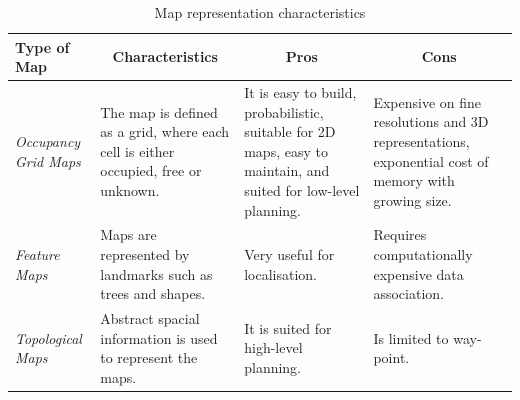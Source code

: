 \begin{table}[H]

\centering
\caption{Map representation characteristics}
\label{table:maprep}
\footnotesize
\begin{tabular}{p{4.5em} p{5.5cm} p{4cm} p{4cm}} 
\toprule[1.5pt] 
\multicolumn{1}{l}{\textbf{Type of Map}} & 
\multicolumn{1}{c}{\textbf{Characteristics}} &
\multicolumn{1}{c}{\textbf{Pros}} &
\multicolumn{1}{c}{\textbf{Cons}}  \\ 
\midrule[0.5pt]
		{\em Occupancy Grid Maps} &
		The map is defined as a grid, where each cell is either occupied, free or unknown. &
		
        It is easy to build, probabilistic, suitable for 2D maps, easy to maintain, and suited for low-level planning. & Expensive on fine resolutions and 3D representations, exponential cost of memory with growing size. \\
\hline
		{\em Feature Maps} & 
		Maps are represented by landmarks such as trees and shapes. & 
		Very useful for localisation. & Requires computationally expensive data association.\\
\hline
		{\em Topological Maps} & 
		Abstract spacial information is used to represent the maps. & 
		It is suited for high-level planning. & Is limited to way-point.\\
\bottomrule[1.5pt] 
	\end{tabular}
\end{table}

